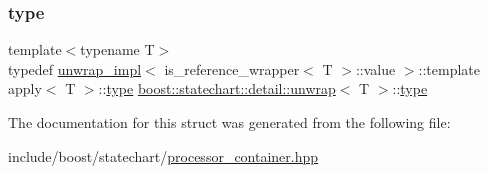 \subsubsection{\texorpdfstring{type}{type}}
{\footnotesize\ttfamily template$<$typename T$>$ \\
typedef \mbox{\hyperlink{structboost_1_1statechart_1_1detail_1_1unwrap__impl}{unwrap\+\_\+impl}}$<$ is\+\_\+reference\+\_\+wrapper$<$ T $>$\+::value $>$\+::template apply$<$ T $>$\+::\mbox{\hyperlink{structboost_1_1statechart_1_1detail_1_1unwrap_a6d01c86942e3bc26e9c7adfc5bbc58c6}{type}} \mbox{\hyperlink{structboost_1_1statechart_1_1detail_1_1unwrap}{boost\+::statechart\+::detail\+::unwrap}}$<$ T $>$\+::\mbox{\hyperlink{structboost_1_1statechart_1_1detail_1_1unwrap_a6d01c86942e3bc26e9c7adfc5bbc58c6}{type}}}



The documentation for this struct was generated from the following file\+:\begin{DoxyCompactItemize}
\item 
include/boost/statechart/\mbox{\hyperlink{processor__container_8hpp}{processor\+\_\+container.\+hpp}}\end{DoxyCompactItemize}
